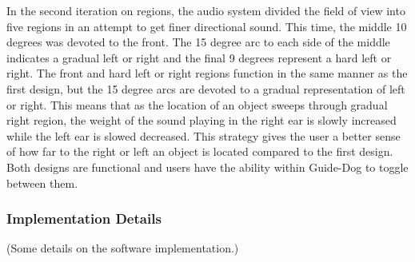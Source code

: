 In the second iteration on regions, the audio system divided the field of view
into five regions in an attempt to get finer directional sound. This time, the
middle 10 degrees was devoted to the front. The 15 degree arc to each side of 
the middle indicates a gradual left or right and the final 9 degrees represent
a hard left or right. The front and hard left or right regions function in the 
same manner as the first design, but the 15 degree arcs are devoted to a gradual
representation of left or right. This means that as the location of an object
sweeps through gradual right region, the weight of the sound playing in the
right ear is slowly increased while the left ear is slowed decreased. This 
strategy gives the user a better sense of how far to the right or left an object
is located compared to the first design. Both designs are functional and users
have the ability within Guide-Dog to toggle between them.

\subsubsection{Implementation Details}
\label{sec:technical-audio-impl}

(Some details on the software implementation.)
